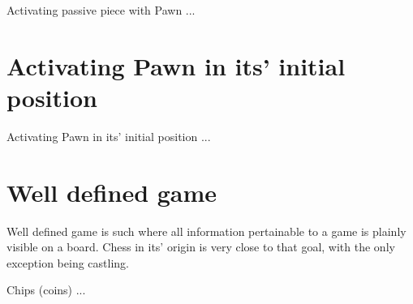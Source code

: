Activating passive piece with Pawn ...


\section*{Activating Pawn in its' initial position}

Activating Pawn in its' initial position ...

\section*{Well defined game}

Well defined game is such where all information pertainable to a game
is plainly visible on a board. Chess in its' origin is very close to
that goal, with the only exception being castling.

Chips (coins) ...

\clearpage %
